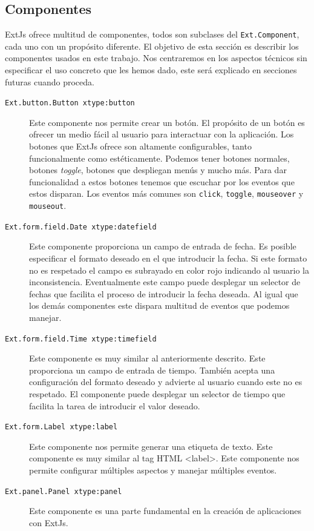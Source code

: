 	\subsection{Componentes}  %
		ExtJs ofrece multitud de componentes, todos son subclases del \texttt{Ext.Component}, cada uno con un propósito diferente. El objetivo
		de esta sección es describir los componentes usados en este trabajo. Nos centraremos en los aspectos técnicos sin especificar el uso
		concreto que les hemos dado, este será explicado en secciones futuras cuando proceda. 
		\begin{description}
			\item[\texttt{Ext.button.Button xtype:button}] Este componente nos permite crear un botón. El propósito de un botón es ofrecer
			  un medio fácil al usuario para interactuar con la aplicación. Los botones que ExtJs ofrece son altamente configurables,
			  tanto funcionalmente como estéticamente. Podemos tener botones normales, botones \emph{toggle}, botones que despliegan menús
			  y mucho más. Para dar funcionalidad a estos botones tenemos que escuchar por los eventos que estos disparan. Los eventos más
			  comunes son \texttt{click}, \texttt{toggle}, \texttt{mouseover} y \texttt{mouseout}.
			\item[\texttt{Ext.form.field.Date xtype:datefield}] Este componente proporciona un campo de entrada de fecha. Es posible
			  especificar el formato deseado en el que introducir la fecha. Si este formato no es respetado el campo es subrayado en color
			  rojo indicando al usuario la inconsistencia. Eventualmente este campo puede desplegar un selector de fechas que facilita el
			  proceso de introducir la fecha deseada. Al igual que los demás componentes este dispara multitud de eventos que podemos
			  manejar.
			\item[\texttt{Ext.form.field.Time xtype:timefield}] Este componente es muy similar al anteriormente descrito. Este proporciona
			  un campo de entrada de tiempo. También acepta una configuración del formato deseado y advierte  al usuario cuando este no es
			  respetado. El componente puede desplegar un selector de tiempo que facilita la tarea de introducir el valor deseado.
			\item[\texttt{Ext.form.Label xtype:label}] Este componente nos permite generar una etiqueta de texto. Este componente es muy
			  similar al tag HTML <label>. Este componente nos permite configurar múltiples aspectos y manejar múltiples eventos.
			\item[\texttt{Ext.panel.Panel xtype:panel}] Este componente es una parte fundamental en la creación de aplicaciones con ExtJs.

\end{description}
